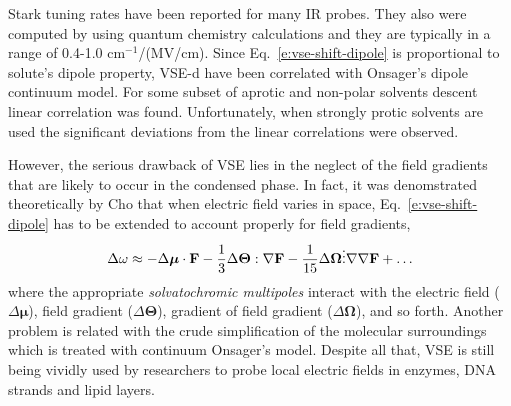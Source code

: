 \documentclass[a4paper,titlepage,twoside,fleqn,12pt]{book}
\newcommand{\BM}[1]{\bm{#1}}
\begin{document}
\begin{refsection}
\begin{equation}
\end{equation}
%
Stark tuning rates have been reported for many IR probes.\citep{Suydam.Boxer.Biochem.2003,Levinson.Fried.Boxer.JPCB.2012}
They also were computed by using quantum chemistry calculations\citep{Dalosto.Vanderkooi.Sharp.JPCB.2004,
Andrews.Boxer.JCPA.2002,Andrews.Boxer.JCPA.2000}
and they are typically in a range of 0.4-1.0 cm$^{-1}$/(MV/cm). 
Since Eq.~\eqref{e:vse-shift-dipole} is proportional to solute's
dipole property, VSE-d have been correlated with Onsager's dipole
continuum model. For some subset of aprotic and non-polar
solvents descent linear correlation was found.\citep{Levinson.Fried.Boxer.JPCB.2012} 
Unfortunately,
when strongly protic solvents are used the significant deviations
from the linear correlations were observed.\citep{Fafarman.Sigala.Herschlag.Boxer.JACS.2010,Bagchi.Fried.Boxer.JACS.2012}

However, the serious drawback of VSE lies in the neglect of the field gradients that are 
likely to occur in the condensed phase. In fact, it was denomstrated theoretically
by Cho\citep{Cho.JCP.2009,Lee.Choi.Cho.JCP.2012} 
that when electric field varies in space, Eq.~\eqref{e:vse-shift-dipole}
has to be extended to account properly for field gradients,
%
\begin{equation} \label{e:vse-shift-multipoles}
 \Delta \omega 
\approx 
             - \Delta {\BM \mu}    \cdot               {\bf F} 
- \frac{1}{3}  \Delta {\BM \Theta} :      \nabla       {\bf F}
- \frac{1}{15} \Delta {\BM \Omega} \vdots \nabla\nabla {\bf F}
+ \ldots
\end{equation}
%
where the appropriate \emph{solvatochromic multipoles}
interact with the electric field ($\Delta {\BM \mu}$), 
field gradient ($\Delta {\BM \Theta}$), gradient of field gradient ($\Delta {\BM \Omega}$),
and so forth.
Another problem is related with the crude simplification of the 
molecular surroundings which is treated with continuum Onsager's model.
Despite all that, VSE is still being vividly
used by researchers to probe local electric fields in enzymes, DNA strands and 
lipid layers. 


\end{refsection}
\end{document}
